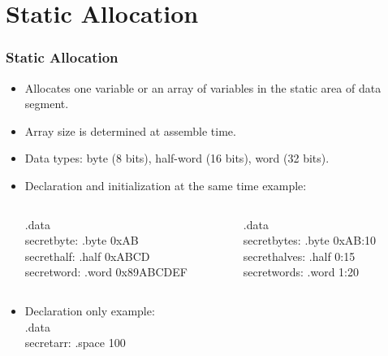\documentclass[
	10pt, %
	hmargin=1cm,vmargin=0cm,head=0.5cm,headsep=0pt,foot=0.5cm,margin=2cm
]{beamer}
\begin{document}
\section{Static Allocation} 
\begin{frame}
	\frametitle{Static Allocation}
	
	\begin{itemize}
		\item Allocates one variable or an array of variables in the static area of data segment. \pause
		\item Array size is determined at assemble time. \pause
		\item Data types: byte (8 bits), half-word (16 bits), word (32 bits). \pause
		\item Declaration and initialization at the same time example:
		\begin{columns}[c]
			\begin{column}{0.45\textwidth}
				\color{red}.data \color{black} \\
				secretbyte: \hspace{.2cm}\color{red}.byte\color{black}\hspace{.33cm} 0xAB \\ 
				secrethalf: \hspace{.30cm}\color{red}.half\color{black}\hspace{.45cm} 0xABCD \\ 
				secretword: \hspace{.065cm}\color{red}.word\color{black}\hspace{.22cm} 0x89ABCDEF \\ 
				\pause
			\end{column}
			\begin{column}{0.45\textwidth}
				\color{red}.data \color{black} \\ 
				secretbytes: \hspace{.18cm}\color{red}.byte\color{black}\hspace{.1cm}  0xAB:10 \\ 
				secrethalves: \hspace{.02cm}\color{red}.half\color{black}\hspace{.82cm}    0:15 \\ 
				secretwords: \hspace{.05cm}\color{red}.word\color{black}\hspace{.6cm}     1:20 \\
				\pause
			\end{column}
		\end{columns}
		\item Declaration only example: \\
			\color{red}.data \color{black} \\ 
			secretarr: \color{red}.space\color{black}\hspace{.1cm} 100
	\end{itemize}
\end{frame}
\end{document}
